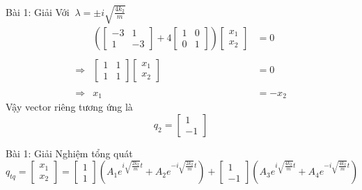 \begin{frame}{Bài 1: Giải}
    Với \(\displaystyle \ \lambda = \pm i \sqrt{\frac{4k_2}{m}}\)
    \begin{equation*}
    \begin{array}{crc}
    &
    \left(\left[
    \begin{array}{cc}
    -3 & 1 \\
    1 & -3
    \end{array}
    \right]  +  4
    \left[
    \begin{array}{cc}
        1 & 0 \\
        0 & 1
    \end{array}
    \right]
    \right) \left[
    \begin{array}{c}
    x_1 \\ x_2
    \end{array}\right] &= 0 \\ \\
    \Rightarrow & 
    \left[
    \begin{array}{cc}
        1 & 1 \\
        1 & 1
    \end{array}
    \right] \left[
    \begin{array}{c}
    x_1 \\
    x_2
    \end{array}\right] &=0 \\ \\
    \Rightarrow & x_1 &= -x_2 
    \end{array}
    \end{equation*}
    Vậy vector riêng tương ứng là
    \begin{equation*}
        q_2 = \left[
        \begin{array}{c}
        1 \\
        -1
        \end{array}
        \right]
    \end{equation*}
\end{frame}
\begin{frame}{Bài 1: Giải}
    Nghiệm tổng quát
    \begin{equation*}
    \displaystyle
        q_{tq} = \left[
        \begin{array}{c}
        x_1 \\
        x_2
        \end{array}
        \right]
        = 
        \left[
        \begin{array}{c}
        1 \\ 1
        \end{array}
        \right] 
        \left( A_1 e^{i \sqrt{\frac{2k_2}{m}}t}  + A_2 e^{- i \sqrt{\frac{2k_2}{m}}t}\right) +  
        \left[
        \begin{array}{c}
        1 \\ -1
        \end{array}
        \right] \left( A_3 e^{ i \sqrt{\frac{4k_2}{m}}t} + A_4 e^{ - i \sqrt{\frac{4k_2}{m}}t}\right)
    \end{equation*}
    
\end{frame}